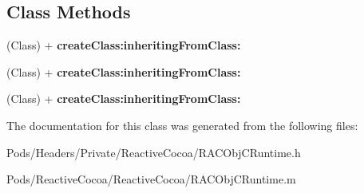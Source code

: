 \subsection*{Class Methods}
\begin{DoxyCompactItemize}
\item 
\mbox{\label{interface_r_a_c_obj_c_runtime_ade5b7a6b84221555ba263902bc973012}} 
(Class) + {\bfseries create\+Class\+:inheriting\+From\+Class\+:}
\item 
\mbox{\label{interface_r_a_c_obj_c_runtime_ade5b7a6b84221555ba263902bc973012}} 
(Class) + {\bfseries create\+Class\+:inheriting\+From\+Class\+:}
\item 
\mbox{\label{interface_r_a_c_obj_c_runtime_ade5b7a6b84221555ba263902bc973012}} 
(Class) + {\bfseries create\+Class\+:inheriting\+From\+Class\+:}
\end{DoxyCompactItemize}


The documentation for this class was generated from the following files\+:\begin{DoxyCompactItemize}
\item 
Pods/\+Headers/\+Private/\+Reactive\+Cocoa/R\+A\+C\+Obj\+C\+Runtime.\+h\item 
Pods/\+Reactive\+Cocoa/\+Reactive\+Cocoa/R\+A\+C\+Obj\+C\+Runtime.\+m\end{DoxyCompactItemize}
